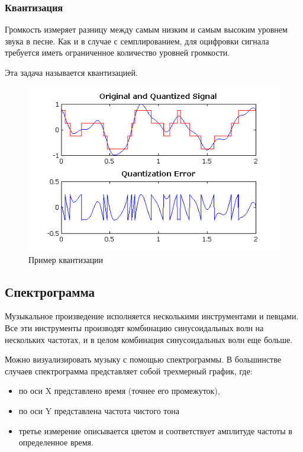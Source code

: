 \subsubsection{Квантизация}
Громкость измеряет разницу между самым
низким и самым высоким уровнем звука в песне.
Как и в случае с семплированием, для оцифровки сигнала требуется иметь ограниченное количество
уровней громкости.

Эта задача называется квантизацией.
\begin{figure}[H]
    \begin{center}
        \includegraphics[scale=0.7]{inc/img/Quanterr.png}
        \caption{Пример квантизации}
    \end{center}
\end{figure}

\subsection{Спектрограмма}
Музыкальное произведение исполняется несколькими инструментами и певцами.
Все эти инструменты производят комбинацию синусоидальных волн на нескольких частотах,
и в целом комбинация синусоидальных волн еще больше.

Можно визуализировать музыку с помощью спектрограммы.
В большинстве случаев спектрограмма представляет собой трехмерный график, где:
\begin{itemize}
    \item по оси X представлено время (точнее его промежуток),
    \item по оси Y представлена частота чистого тона
    \item третье измерение описывается цветом и соответствует амплитуде частоты в определенное время.
\end{itemize}

